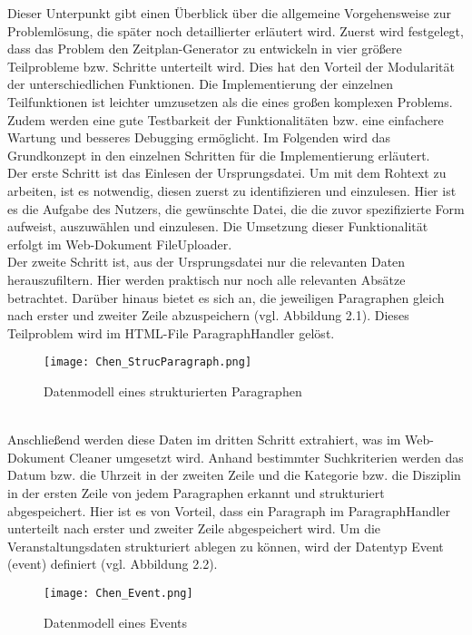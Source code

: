 Dieser Unterpunkt gibt einen Überblick über die allgemeine Vorgehensweise zur Problemlösung, die später noch detaillierter erläutert wird. 
Zuerst wird festgelegt, dass das Problem den Zeitplan-Generator zu entwickeln in vier größere Teilprobleme bzw. Schritte unterteilt wird. Dies hat den Vorteil der Modularität der unterschiedlichen Funktionen. Die Implementierung der einzelnen Teilfunktionen ist leichter umzusetzen als die eines großen komplexen Problems. Zudem werden eine gute Testbarkeit der Funktionalitäten bzw. eine einfachere Wartung und besseres Debugging ermöglicht. Im Folgenden wird das Grundkonzept in den einzelnen Schritten für die Implementierung erläutert.\\
Der erste Schritt ist das Einlesen der Ursprungsdatei. Um mit dem Rohtext zu arbeiten, ist es notwendig, diesen zuerst zu identifizieren und einzulesen. Hier ist es die Aufgabe des Nutzers, die gewünschte Datei, die die zuvor spezifizierte Form aufweist, auszuwählen und einzulesen. Die Umsetzung dieser Funktionalität erfolgt im Web-Dokument FileUploader.\\ 
Der zweite Schritt ist, aus der Ursprungsdatei nur die relevanten Daten herauszufiltern. Hier werden praktisch nur noch alle relevanten Absätze betrachtet. Darüber hinaus bietet es sich an, die jeweiligen Paragraphen gleich nach erster und zweiter Zeile abzuspeichern (vgl. Abbildung 2.1). Dieses Teilproblem wird im HTML-File ParagraphHandler gelöst.
\begin{figure}[htbp]
  \centering
  \texttt{[image: Chen\_StrucParagraph.png]}
  \caption{Datenmodell eines strukturierten Paragraphen}
  \label{fig:Fig1}
\end{figure}\\
Anschließend werden diese Daten im dritten Schritt extrahiert, was im Web-Dokument Cleaner umgesetzt wird. Anhand bestimmter Suchkriterien werden das Datum bzw. die Uhrzeit in der zweiten Zeile und die Kategorie bzw. die Disziplin in der ersten Zeile von jedem Paragraphen erkannt und strukturiert abgespeichert. Hier ist es von Vorteil, dass ein Paragraph im ParagraphHandler unterteilt nach erster und zweiter Zeile abgespeichert wird. Um die Veranstaltungsdaten strukturiert ablegen zu können, wird der Datentyp Event (event) definiert (vgl. Abbildung 2.2).
\begin{figure}[htbp]
  \centering
  \texttt{[image: Chen\_Event.png]}
  \caption{Datenmodell eines Events}
  \label{fig:Fig1}
\end{figure}\\

